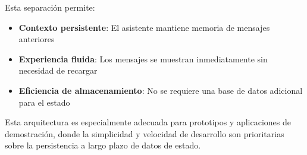 Esta separación permite:
\begin{itemize}
    \item \textbf{Contexto persistente}: El asistente mantiene memoria de mensajes anteriores
    \item \textbf{Experiencia fluida}: Los mensajes se muestran inmediatamente sin necesidad de recargar
    \item \textbf{Eficiencia de almacenamiento}: No se requiere una base de datos adicional para el estado
\end{itemize}

Esta arquitectura es especialmente adecuada para prototipos y aplicaciones de demostración, donde la simplicidad y velocidad de desarrollo son prioritarias sobre la persistencia a largo plazo de datos de estado.
